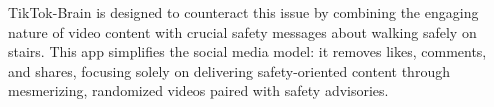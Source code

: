 \documentclass{article}
\begin{document}
TikTok-Brain is designed to counteract this issue by combining the engaging nature of video content
with crucial safety messages about walking safely on stairs.
This app simplifies the social media model: it removes likes, comments, and shares,
focusing solely on delivering safety-oriented content through mesmerizing, randomized videos paired with safety advisories.






\end{document}
